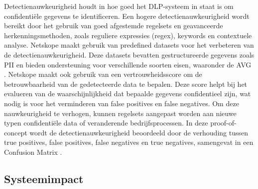 Detectienauwkeurigheid houdt in hoe goed het DLP-systeem in staat is om confidentiële gegevens te identificeren. 
Een hogere detectienauwkeurigheid wordt bereikt door het gebruik van goed afgestemde regelsets en geavanceerde herkenningsmethoden, zoals reguliere expressies (regex), keywords en contextuele analyse.
Netskope maakt gebruik van predefined datasets voor het verbeteren van de detectienauwkeurigheid. 
Deze datasets bevatten gestructureerde gegevens zoals PII en bieden ondersteuning voor verschillende soorten eisen, waaronder de AVG \autocite{Clementelli2023}. 
Netskope maakt ook gebruik van een vertrouwheidsscore om de betrouwbaarheid van de gedetecteerde data te bepalen. 
Deze score helpt bij het evalueren van de waarschijnlijkheid dat bepaalde gegevens confidentieel zijn, 
wat nodig is voor het verminderen van false positives en false negatives. 
Om deze nauwkeurigheid te verhogen, kunnen regelsets aangepast worden aan nieuwe typen confidentiële data of veranderende bedrijfsprocessen.
In deze proof-of-concept wordt de detectienauwkeurigheid beoordeeld door de verhouding tussen true positives, false positives, 
false negatives en true negatives, samengevat in een Confusion Matrix \autocite{Microsoftn.d.}.

\subsection{Systeemimpact}
\label{sec:systeemimpact-literatuurstudie}



